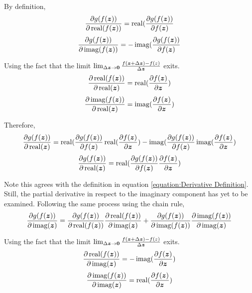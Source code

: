 \begin{appendices}
By definition,
\begin{equation}
\frac{\partial g(f(\bm{z}))}{\partial \operatorname{real}(f(\bm{z}))} = \operatorname{real}(\frac{\partial g(f(\bm{z}))}{\partial f(\bm{z})}
\end{equation}
\begin{equation}
\frac{\partial g(f(\bm{z}))}{\partial \operatorname{imag}(f(\bm{z}))} = -\operatorname{imag}(\frac{\partial g(f(\bm{z}))}{\partial f(\bm{z})}
\end{equation}

Using the fact that the limit $\lim_{\Delta \bm{z} \rightarrow \bm{0}} \frac{f(\bm{z} + \Delta \bm{z}) - f(z)}{\Delta \bm{z}}$ exits.
\begin{equation}
\frac{\partial \operatorname{real}(f(\bm{z}))}{\partial \operatorname{real}(\bm{z})} = \operatorname{real}(\frac{\partial f(\bm{z})}{\partial \bm{z}})
\end{equation}
\begin{equation}
\frac{\partial \operatorname{imag}(f(\bm{z}))}{\partial \operatorname{real}(\bm{z})} = \operatorname{imag}(\frac{\partial f(\bm{z})}{\partial \bm{z}})
\end{equation}

Therefore,
\begin{equation}
\frac{\partial g(f(\bm{z}))}{\partial \operatorname{real}(\bm{z})} = \operatorname{real}(\frac{\partial g(f(\bm{z}))}{\partial f(\bm{z})}\operatorname{real}(\frac{\partial f(\bm{z})}{\partial \bm{z}}) - \operatorname{imag}(\frac{\partial g(f(\bm{z}))}{\partial f(\bm{z})}\operatorname{imag}(\frac{\partial f(\bm{z})}{\partial \bm{z}})
\end{equation}
\begin{equation} \label{equation:Partial Derivative for Real Component}
\frac{\partial g(f(\bm{z}))}{\partial \operatorname{real}(\bm{z})} = \operatorname{real}(\frac{\partial g(f(\bm{z}))}{\partial f(\bm{z})}\frac{\partial f(\bm{z})}{\partial \bm{z}})
\end{equation}

Note this agrees with the definition in equation \ref{equation:Derivative Definition}. Still, the partial derivative in respect to the imaginary component has yet to be examined. Following the same process using the chain rule,
\begin{equation}
\frac{\partial g(f(\bm{z}))}{\partial \operatorname{imag}(\bm{z})} = \frac{\partial g(f(\bm{z}))}{\partial \operatorname{real}(f(\bm{z}))}\frac{\partial \operatorname{real}(f(\bm{z}))}{\partial \operatorname{imag}(\bm{z})} + \frac{\partial g(f(\bm{z}))}{\partial \operatorname{imag}(f(\bm{z}))}\frac{\partial \operatorname{imag}(f(\bm{z}))}{\partial \operatorname{imag}(\bm{z})}
\end{equation}

Using the fact that the limit $\lim_{\Delta \bm{z} \rightarrow \bm{0}} \frac{f(\bm{z} + \Delta \bm{z}) - f(z)}{\Delta \bm{z}}$ exits.
\begin{equation}
\frac{\partial \operatorname{real}(f(\bm{z}))}{\partial \operatorname{imag}(\bm{z})} = -\operatorname{imag}(\frac{\partial f(\bm{z})}{\partial \bm{z}})
\end{equation}
\begin{equation}
\frac{\partial \operatorname{imag}(f(\bm{z}))}{\partial \operatorname{imag}(\bm{z})} = \operatorname{real}(\frac{\partial f(\bm{z})}{\partial \bm{z}})
\end{equation}


\end{appendices}
